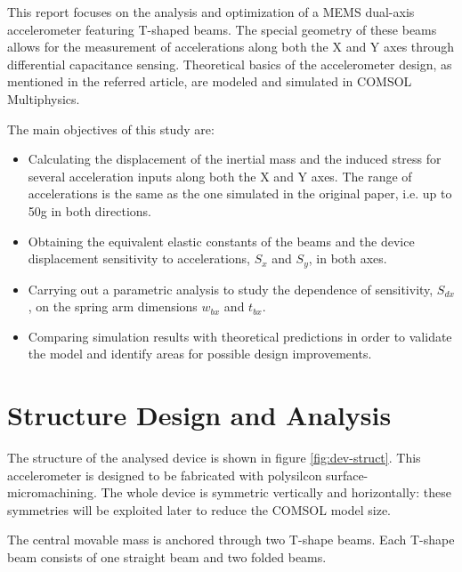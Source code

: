 \documentclass[lettersize,journal]{IEEEtran}
\begin{document}
        This report focuses on the analysis and optimization of a MEMS dual-axis accelerometer featuring T-shaped beams. The special geometry of these beams allows for the measurement of accelerations along both the X and Y axes through differential capacitance sensing. Theoretical basics of the accelerometer design, as mentioned in the referred article, are modeled and simulated in COMSOL Multiphysics.
        
        The main objectives of this study are:
        \begin{itemize}
        \item Calculating the displacement of the inertial mass and the induced stress for several acceleration inputs along both the X and Y axes. The range of accelerations is the same as the one simulated in the original paper, i.e. up to 50g in both directions.
        \item Obtaining the equivalent elastic constants of the beams and the device displacement sensitivity to accelerations, \(S_{x}\) and \(S_{y}\), in both axes.
        \item Carrying out a parametric analysis to study the dependence of sensitivity, \(S_{dx}\), on the spring arm dimensions \(w_{bx}\) and \(t_{bx}\).
        \item Comparing simulation results with theoretical predictions in order to validate the model and identify areas for possible design improvements.
        \end{itemize}
        
    \section{Structure Design and Analysis}
        The structure of the analysed device is shown in figure \ref{fig:dev-struct}. This accelerometer is designed to be fabricated with polysilcon surface-micromachining. The whole device is symmetric vertically and horizontally: these symmetries will be exploited later to reduce the COMSOL model size.
        
        The central movable mass is anchored through two T-shape beams. Each T-shape beam consists of one straight beam and two folded beams.
        
\end{document}
